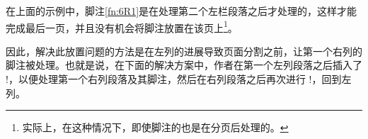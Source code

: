 在上面的示例中，脚注\ref{fn:6R1}是在处理第二个左栏段落之后才处理的，这样才能完成最后一页，并且没有机会将脚注放置在该页上\footnote{实际上，在这种情况下，即使脚注的也是在分页后处理的。}。


因此，解决此放置问题的方法是在左列的进展导致页面分割之前，让第一个右列的脚注被处理。也就是说，在下面的解决方案中，作者在第一个左列段落之后插入了 \!\switchcolumn!，以便处理第一个右列段落及其脚注，然后在右列段落之后再次进行 \!\switchcolumn!，回到左列。

